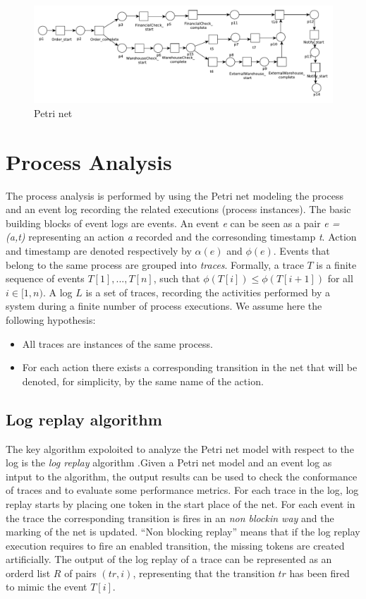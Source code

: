 \documentclass{llncs}
\begin{document}
\begin{figure}[h]
\includegraphics[width=360pt]
{./items/Sales_PN.pdf}
\caption{Petri net}
\label{pnet}
\end{figure}


\section{Process Analysis}\label{Background}

The process analysis is performed by using the Petri net modeling the process and an event log recording the related executions (process instances). The basic building blocks of event logs are events. An event {\itshape e} can be seen as a pair {\itshape e = (a,t) } representing an action {\itshape a } recorded and the corresonding timestamp {\itshape t}. Action and timestamp are denoted respectively by $\alpha(e)$ and $\phi(e)$. Events that belong to the same process are grouped into {\itshape traces}. Formally, a trace $T$ is a finite sequence of events $T[1],..., T[n]$, such that $\phi(T[i]) \leq \phi(T[i+1])$ for all  $i \in [1,n)$. A log $L$ is a set of traces, recording the activities performed by a system during a finite number of process executions. We assume here the following hypothesis:
\begin{itemize}
\item All traces are instances of the same process.
\item For each action there exists a corresponding transition in the net that will be denoted, for simplicity, by the same name of the action.
\end{itemize}

\subsection{Log replay algorithm}

The key algorithm expoloited to analyze the Petri net model with respect to the log is the {\itshape log replay} algorithm \cite{} .Given a Petri net model and an event log as intput to the algorithm, the output results can be used to check the conformance of traces and to evaluate some performance metrics. For each trace in the log, log replay starts by placing one token in the start place of the net. For each event in the trace the corresponding transition is fires in an {\itshape non blockin way} and the marking of the net is updated. ``Non blocking replay'' means that if the log replay execution requires to fire an enabled transition, the missing tokens are created artificially. The output of the log replay of a trace can be represented as an orderd list $R$ of pairs $(tr, i)$, representing that the transition $tr$ has been fired to mimic the event $T[i]$.
\\
\end{document}
